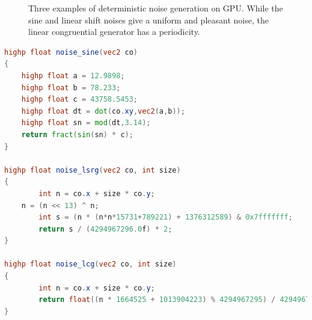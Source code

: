 \begin{figure}
\centering
{} 
\caption{Three examples of deterministic noise generation on GPU. While the sine and linear shift noises give a uniform and pleasant noise, the linear congruential generator has a periodicity.}
\label{fig:noises}
\end{figure}

\begin{lstlisting}[language=GLSL,label=lst:sinegenerator,caption={Three GLSL functions to generate random points on the GPU. The extra size parameter is the height of one layer of the radiance map texture.}]
highp float noise_sine(vec2 co)
{
    highp float a = 12.9898;
    highp float b = 78.233;
    highp float c = 43758.5453;
    highp float dt = dot(co.xy,vec2(a,b));
    highp float sn = mod(dt,3.14);
    return fract(sin(sn) * c);
}

highp float noise_lsrg(vec2 co, int size)
{
		int n = co.x + size * co.y;
    n = (n << 13) ^ n;
		int s = (n * (n*n*15731+789221) + 1376312589) & 0x7fffffff;
		return s / (4294967296.0f) * 2;
}

highp float noise_lcg(vec2 co, int size)
{
		int n = co.x + size * co.y;
		return float((n * 1664525 + 1013904223) % 4294967295) / 4294967296.0f;
}
\end{lstlisting}



